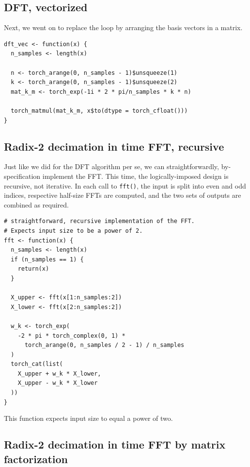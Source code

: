 \documentclass[
  letterpaper,
]{krantz}
\begin{document}
\hypertarget{dft-vectorized}{%
\subsection{DFT, vectorized}\label{dft-vectorized}}

Next, we went on to replace the loop by arranging the basis vectors in a
matrix.

\begin{verbatim}
dft_vec <- function(x) {
  n_samples <- length(x)

  n <- torch_arange(0, n_samples - 1)$unsqueeze(1)
  k <- torch_arange(0, n_samples - 1)$unsqueeze(2)
  mat_k_m <- torch_exp(-1i * 2 * pi/n_samples * k * n)

  torch_matmul(mat_k_m, x$to(dtype = torch_cfloat()))
}
\end{verbatim}

\hypertarget{radix-2-decimation-in-time-fft-recursive}{%
\subsection{Radix-2 decimation in time FFT,
recursive}\label{radix-2-decimation-in-time-fft-recursive}}

Just like we did for the DFT algorithm per se, we can straightforwardly,
by-specification implement the FFT. This time, the logically-imposed
design is recursive, not iterative. In each call to \texttt{fft()}, the
input is split into even and odd indices, respective half-size FFTs are
computed, and the two sets of outputs are combined as required.

\begin{verbatim}
# straightforward, recursive implementation of the FFT.
# Expects input size to be a power of 2.
fft <- function(x) {
  n_samples <- length(x)
  if (n_samples == 1) {
    return(x)
  }

  X_upper <- fft(x[1:n_samples:2])
  X_lower <- fft(x[2:n_samples:2])

  w_k <- torch_exp(
    -2 * pi * torch_complex(0, 1) *
      torch_arange(0, n_samples / 2 - 1) / n_samples
  )
  torch_cat(list(
    X_upper + w_k * X_lower,
    X_upper - w_k * X_lower
  ))
}
\end{verbatim}

This function expects input size to equal a power of two.

\hypertarget{radix-2-decimation-in-time-fft-by-matrix-factorization}{%
\subsection{Radix-2 decimation in time FFT by matrix
factorization}\label{radix-2-decimation-in-time-fft-by-matrix-factorization}}
\end{document}
